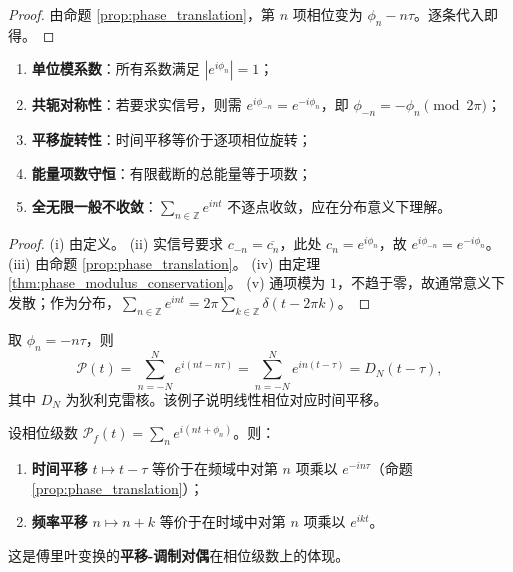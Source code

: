 \begin{proof}
由命题 \ref{prop:phase_translation}，第 $n$ 项相位变为 $\phi_n-n\tau$。逐条代入即得。
\end{proof}

\begin{property}[相位级数的基本性质]\label{prop:phase_series_properties}
\begin{enumerate}[label=(\roman*)]
    \item \textbf{单位模系数}：所有系数满足 $|e^{i\phi_n}|=1$；
    \item \textbf{共轭对称性}：若要求实信号，则需 $e^{i\phi_{-n}}=e^{-i\phi_n}$，即 $\phi_{-n}=-\phi_n \pmod{2\pi}$；
    \item \textbf{平移旋转性}：时间平移等价于逐项相位旋转；
    \item \textbf{能量项数守恒}：有限截断的总能量等于项数；
    \item \textbf{全无限一般不收敛}：$\sum_{n\in\mathbb{Z}}e^{int}$ 不逐点收敛，应在分布意义下理解。
\end{enumerate}
\end{property}

\begin{proof}
(i) 由定义。 (ii) 实信号要求 $c_{-n}=\overline{c_n}$，此处 $c_n=e^{i\phi_n}$，故 $e^{i\phi_{-n}}=e^{-i\phi_n}$。 (iii) 由命题 \ref{prop:phase_translation}。 (iv) 由定理 \ref{thm:phase_modulus_conservation}。 (v) 通项模为 $1$，不趋于零，故通常意义下发散；作为分布，$\sum_{n\in\mathbb{Z}}e^{int}=2\pi\sum_{k\in\mathbb{Z}}\delta(t-2\pi k)$。
\end{proof}

\begin{example}[线性相位与时间平移]\label{ex:linear_phase}
取 $\phi_n=-n\tau$，则
\[
\mathcal{P}(t)=\sum_{n=-N}^{N} e^{i(nt-n\tau)}
= \sum_{n=-N}^{N} e^{in(t-\tau)}
= D_N(t-\tau),
\]
其中 $D_N$ 为狄利克雷核。该例子说明线性相位对应时间平移。
\end{example}

\begin{proposition}\label{prop:phase_rotation_translation_duality}
设相位级数 $\mathcal{P}_f(t) = \sum_n e^{i(nt+\phi_n)}$。则：
\begin{enumerate}[label=(\roman*)]
  \item \textbf{时间平移} $t \mapsto t - \tau$ 等价于在频域中对第 $n$ 项乘以 $e^{-in\tau}$（命题 \ref{prop:phase_translation}）；
  \item \textbf{频率平移} $n \mapsto n + k$ 等价于在时域中对第 $n$ 项乘以 $e^{ikt}$。
\end{enumerate}
这是傅里叶变换的\textbf{平移-调制对偶}在相位级数上的体现。
\end{proposition}

